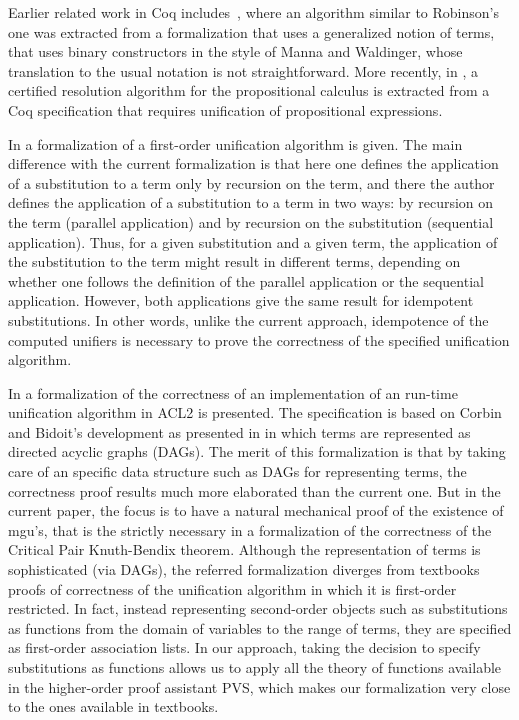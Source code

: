 \documentclass[submission,copyright,creativecommons]{eptcs}
\begin{document}
  Earlier related work in Coq includes~\cite{Rou1992}, where an
  algorithm similar to Robinson's one was extracted from a
  formalization that uses a generalized notion of terms, that uses
  binary constructors in the style of Manna and Waldinger, whose
  translation to the usual notation is not straightforward. More
  recently, in \cite{Constable09}, a certified resolution algorithm
  for the propositional calculus is extracted from a Coq specification
  that requires unification of propositional expressions.


  In \cite{Bove1999} a formalization of a first-order unification
  algorithm is given. The main difference with the current formalization is
  that here one defines the application of a substitution to a term only by
  recursion on the term, and there the author defines the application of a
  substitution to a term in two ways: by recursion on the term
  (parallel application) and by recursion on the substitution
  (sequential application). Thus, for a given substitution and a given
  term, the application of the substitution to the term might result
  in different terms, depending on whether one follows the definition
  of the parallel application or the sequential application. However,
  both applications give the same result for idempotent
  substitutions. In other words, unlike the current approach, idempotence of
  the computed unifiers is necessary to prove the correctness of the
  specified unification algorithm.

  In \cite{RRMMAH2006} a formalization of the correctness of an
  implementation of an  run-time unification algorithm in ACL2
  is presented. The specification is based on Corbin and Bidoit's
  development \cite{CoBi83} as presented in \cite{BaNi98} in which
  terms are represented as directed acyclic graphs (DAGs). The merit
  of this formalization is that by taking care of an specific data
  structure such as DAGs for representing terms, the correctness proof
  results much more elaborated than the current one. But in the
  current paper, the focus is to have a natural mechanical proof of
  the existence of mgu's, that is the strictly necessary in a
  formalization of the correctness of the Critical Pair Knuth-Bendix
  theorem. Although the representation of terms is sophisticated (via
  DAGs), the referred formalization diverges from textbooks proofs of
  correctness of the unification algorithm in which it is first-order
  restricted. In fact, instead representing second-order objects such
  as substitutions as functions from the domain of variables to the
  range of terms, they are specified as first-order association
  lists. In our approach, taking the decision to specify substitutions
  as functions allows us to apply all the theory of functions
  available in the higher-order proof assistant PVS, which makes our
  formalization very close to the ones available in textbooks.
\end{document}
